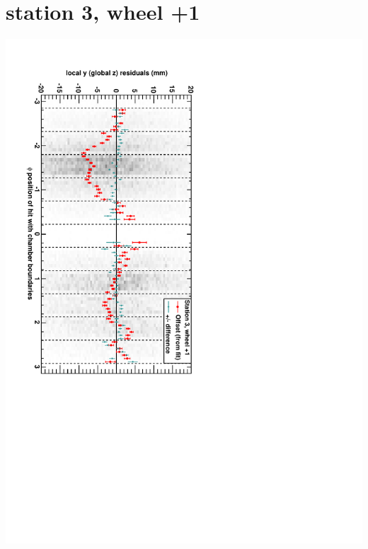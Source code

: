 \documentclass[compress]{beamer}
\begin{document}
\section*{station 3, wheel +1}
\begin{frame} \vfill \mbox{\hspace{-1 cm}\includegraphics[height=1.2\linewidth, angle=90]{DTzVsPhi_st3_whD.pdf}} \end{frame}
\end{document}
